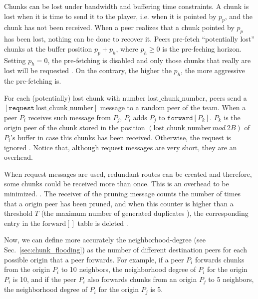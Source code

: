 

\label{sec:routes_discovery}

Chunks can be lost under bandwidth and buffering time constraints. A
chunk is lost when it is time to send it to the player, i.e. when it
is pointed by $p_p$, and the chunk has not been received. 
When a peer realizes that a chunk pointed by $p_p$ has been lost,
nothing can be done to recover it. Peers pre-fetch ``potentially
lost'' chunks at the buffer position $p_p+p_h$, where $p_h\geq 0$ is
the pre-feching horizon. Setting $p_h=0$, the pre-fetching is
disabled and only those chunks that really are lost will be
requested . 
On the contrary, the higher the $p_h$, the more aggressive
the pre-fetching is.  

For each (potentially) lost chunk with number
$\text{lost\_chunk\_number}$, peers send a
$[\mathtt{request}~\text{lost\_chunk\_number}]$ message to a random
peer of the team. When a peer $P_i$ receives such message from 
$P_j$, $P_i$ adds $P_j$ to $\mathtt{forward}[P_k]$. $P_k$ is the
origin peer of the chunk stored in the position
$(\text{lost\_chunk\_number}~\mathit{mod}~2B)$ of $P_i$'s buffer in case this
chunks has been received. Otherwise, the request is ignored . Notice
that, although request messages are very short, they are an overhead.

When request messages are used, redundant routes can be created and
therefore, some chunks could be received more than once. This is an overhead to be minimized. . The receiver of the pruning message counts the number of times that a origin peer has been pruned, and when this counter is higher than a threshold $T$ (the maximum number of generated duplicates ), the corresponding entry in the $\text{forward}[]$ table is deleted .

Now, we can define more accurately the \gls{neighborhood-degree} (see
Sec.~\ref{sec:chunk_flooding}) as the number of different destination
peers for each possible origin that a peer forwards. For example, if a
peer $P_i$ forwards chunks from the origin $P_i$ to 10 neighbors, the
neighborhood degree of $P_i$ for the origin $P_i$ is 10, and if the
peer $P_i$ also forwards chunks from an origin $P_j$ to 5 neighbors,
the neighborhood degree of $P_i$ for the origin $P_j$ is 5.

